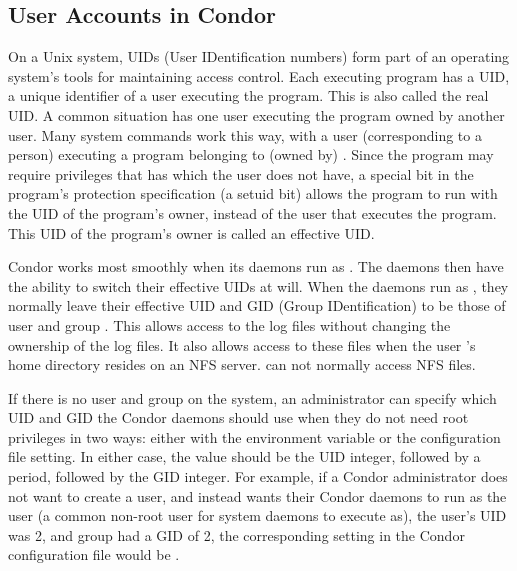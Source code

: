 \subsection{\label{sec:uids}User Accounts in Condor}


On a Unix system,
UIDs (User IDentification numbers) form part of an operating system's
tools for maintaining access control.
Each executing program has a UID,
a unique identifier of a user executing the program.
This is also called the real UID.
A common situation has one user executing the program owned
by another user.
Many system commands work this way, with a user (corresponding
to a person) executing a program belonging to (owned by) .
Since the program may require privileges that  has which
the user does not have, a special bit in the program's
protection specification (a setuid bit) allows the program
to run with the UID of the program's owner, instead of the
user that executes the program.
This UID of the program's owner is called an effective UID.

Condor works most smoothly when its daemons run as .
The daemons then have the ability to switch their 
effective UIDs at will.
When the daemons run as ,
they normally leave their effective UID and GID (Group IDentification)
to be those of user and group .
This allows access to the log files without
changing the ownership of the log files.
It also allows access to these files when
the user 's home directory resides on an NFS server.
 can not normally access NFS files.

If there is no  user and group on the system, an
administrator can specify which UID and GID the Condor daemons should
use when they do not need root privileges in two ways:
either with the  environment variable or the
 configuration file setting.
In either case, the value should be the UID integer, followed by a
period, followed by the GID integer.
For example, if a Condor administrator does not want to create a
 user, and instead wants their Condor daemons to run as
the  user (a common non-root user for system daemons to
execute as), the  user's UID was 2, and group
 had a GID of 2, the corresponding setting in the Condor
configuration file would be .

